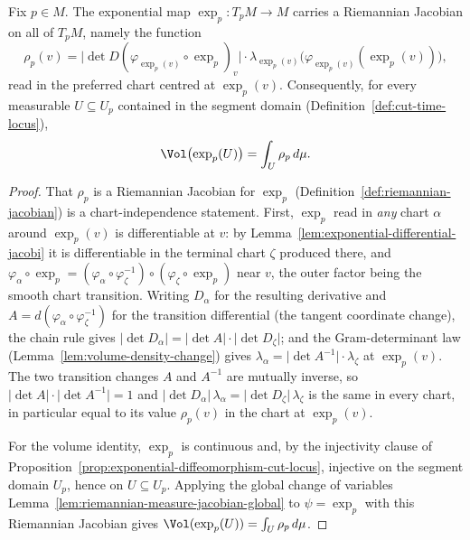 \begin{lemma}
\label{lem:exponential-riemannian-jacobian}
\leanok
Fix $p\in M$. The exponential map $\exp_p\colon T_pM\to M$ carries a Riemannian
Jacobian on all of $T_pM$, namely the function
$$\rho_p(v)=\bigl\lvert\det D(\varphi_{\exp_p(v)}\circ\exp_p)_v\bigr\rvert\cdot
  \lambda_{\exp_p(v)}\bigl(\varphi_{\exp_p(v)}(\exp_p(v))\bigr),$$
read in the preferred chart centred at $\exp_p(v)$. Consequently, for every measurable
$U\subseteq U_p$ contained in the segment domain (Definition~\ref{def:cut-time-locus}),
$$\Vol\bigl(\exp_p(U)\bigr)=\int_U\rho_p\,d\mu.$$
\end{lemma}

\begin{proof}
\leanok
That $\rho_p$ is a Riemannian Jacobian for $\exp_p$
(Definition~\ref{def:riemannian-jacobian}) is a chart-independence statement. First,
$\exp_p$ read in \emph{any} chart $\alpha$ around $\exp_p(v)$ is differentiable at $v$: by
Lemma~\ref{lem:exponential-differential-jacobi} it is differentiable in the terminal chart
$\zeta$ produced there, and $\varphi_\alpha\circ\exp_p
=(\varphi_\alpha\circ\varphi_\zeta^{-1})\circ(\varphi_\zeta\circ\exp_p)$ near $v$, the
outer factor being the smooth chart transition. Writing $D_\alpha$ for the resulting
derivative and $A=d(\varphi_\alpha\circ\varphi_\zeta^{-1})$ for the transition
differential (the tangent coordinate change), the chain rule gives
$\lvert\det D_\alpha\rvert=\lvert\det A\rvert\cdot\lvert\det D_\zeta\rvert$; and the
Gram-determinant law (Lemma~\ref{lem:volume-density-change}) gives
$\lambda_\alpha=\lvert\det A^{-1}\rvert\cdot\lambda_\zeta$ at $\exp_p(v)$. The two
transition changes $A$ and $A^{-1}$ are mutually inverse, so
$\lvert\det A\rvert\cdot\lvert\det A^{-1}\rvert=1$ and
$\lvert\det D_\alpha\rvert\,\lambda_\alpha
=\lvert\det D_\zeta\rvert\,\lambda_\zeta$ is the same in every chart, in particular equal
to its value $\rho_p(v)$ in the chart at $\exp_p(v)$.

For the volume identity, $\exp_p$ is continuous and, by the injectivity clause of
Proposition~\ref{prop:exponential-diffeomorphism-cut-locus}, injective on the segment
domain $U_p$, hence on $U\subseteq U_p$. Applying the global change of variables
Lemma~\ref{lem:riemannian-measure-jacobian-global} to $\psi=\exp_p$ with this Riemannian
Jacobian gives $\Vol(\exp_p(U))=\int_U\rho_p\,d\mu$.
\end{proof}

